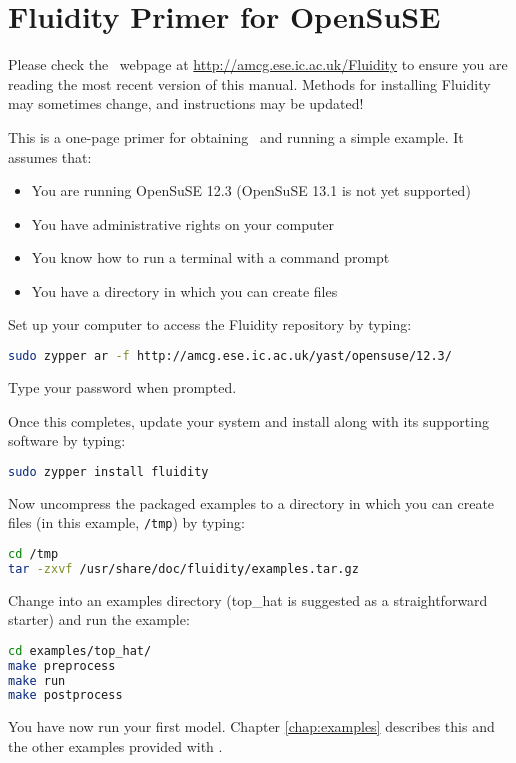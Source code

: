 \chapter*{Fluidity Primer for OpenSuSE}

Please check the \fluidity\ webpage at
\href{http://amcg.ese.ic.ac.uk/Fluidity}{http://amcg.ese.ic.ac.uk/Fluidity}
to ensure you are reading the most recent version of this manual. Methods for
installing Fluidity may sometimes change, and instructions may be updated!

This is a one-page primer for obtaining \fluidity\ and running a simple example. It assumes that:

\begin{itemize}
 \item You are running OpenSuSE 12.3 (OpenSuSE 13.1 is not yet supported)
 \item You have administrative rights on your computer
 \item You know how to run a terminal with a command prompt
 \item You have a directory in which you can create files
\end{itemize}

Set up your computer to access the Fluidity repository by typing:

\begin{lstlisting}[language=Bash]
sudo zypper ar -f http://amcg.ese.ic.ac.uk/yast/opensuse/12.3/
\end{lstlisting}

Type your password when prompted.

Once this completes, update your system and install \fluidity along with its
supporting software by typing:

\begin{lstlisting}[language=Bash]
sudo zypper install fluidity
\end{lstlisting}

Now uncompress the packaged examples to a directory in which you can create
files (in this example, \lstinline[language=Bash]+/tmp+) by typing:

\begin{lstlisting}[language=Bash]
cd /tmp
tar -zxvf /usr/share/doc/fluidity/examples.tar.gz
\end{lstlisting}

Change into an examples directory (top\_hat is suggested as a straightforward
starter) and run the example:

\begin{lstlisting}[language=Bash]
cd examples/top_hat/
make preprocess
make run
make postprocess
\end{lstlisting}

You have now run your first \fluidity model. Chapter \ref{chap:examples}
describes this and the other examples provided with \fluidity.
